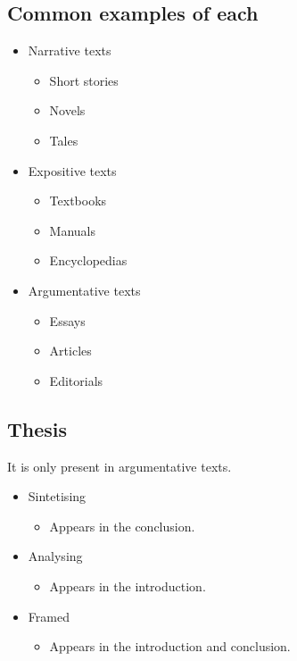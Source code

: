 \documentclass{article}
\begin{document}
\subsection*{Common examples of each}

\begin{itemize}
    \item Narrative texts
    \begin{itemize}
        \item Short stories
        \item Novels
        \item Tales
    \end{itemize}
    \item Expositive texts
    \begin{itemize}
        \item Textbooks
        \item Manuals
        \item Encyclopedias
    \end{itemize}
    \item Argumentative texts
    \begin{itemize}
        \item Essays
        \item Articles
        \item Editorials
    \end{itemize}
\end{itemize}

\subsection*{Thesis}

It is only present in argumentative texts.

\begin{itemize}
    \item Sintetising
    \begin{itemize}
        \item Appears in the conclusion.
    \end{itemize}
    \item Analysing
    \begin{itemize}
        \item Appears in the introduction.
    \end{itemize}
    \item Framed
    \begin{itemize}
        \item Appears in the introduction and conclusion.
    \end{itemize}
\end{itemize}
\end{document}
